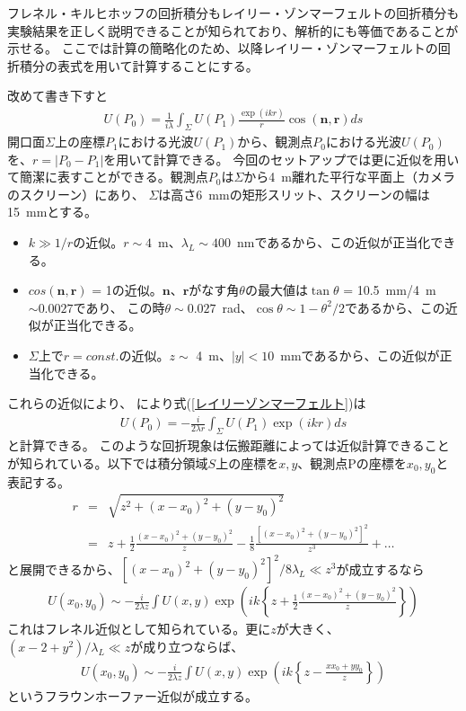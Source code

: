 \documentclass[a4paper,11pt,uplatex]{jsbook}
\begin{document}
フレネル・キルヒホッフの回折積分もレイリー・ゾンマーフェルトの回折積分も実験結果を正しく説明できることが知られており、解析的にも等価であることが示せる\cite{FToptics}。
ここでは計算の簡略化のため、以降レイリー・ゾンマーフェルトの回折積分の表式を用いて計算することにする。

改めて書き下すと
\begin{eqnarray}
  U(P_0) = \frac{1}{i\lambda}\int_{\Sigma} U(P_1)\frac{\exp(ikr)}{r}\cos(\bm{n},\bm{r})ds
\end{eqnarray}\label{レイリーゾンマーフェルト}
開口面$\Sigma$上の座標$P_1$における光波$U(P_1)$から、観測点$P_0$における光波$U(P_0)$を、$r = |P_0- P_1|$を用いて計算できる。
今回のセットアップでは更に近似を用いて簡潔に表すことができる。観測点$P_0$は$\Sigma$から4~m離れた平行な平面上（カメラのスクリーン）にあり、
$\Sigma$は高さ6~mmの矩形スリット、スクリーンの幅は15~mmとする。
\begin{itemize}
  \item $k \gg 1/r$の近似。$r\sim4$~m、$\lambda_L \sim 400$~nmであるから、この近似が正当化できる。
  \item $cos(\bm{n},\bm{r})$ = 1の近似。$\bm{n}$、$\bm{r}$がなす角$\theta$の最大値は$\tan\theta$ = 10.5~mm/4~m $\sim 0.0027$であり、
  この時$\theta\sim 0.027$~rad、$\cos\theta \sim 1 - \theta^2/2$であるから、この近似が正当化できる。
  \item $\Sigma$上で$r = const.$の近似。$z\sim$ 4~m、$|y|<10$~mmであるから、この近似が正当化できる。
\end{itemize}
これらの近似により、
により式(\ref{レイリーゾンマーフェルト})は
\begin{eqnarray}
  U(P_0) = -\frac{i}{2\lambda r} \int_{\Sigma} U(P_1)\exp(ikr) ds
  \label{レイリーゾンマーフェルト近似}
\end{eqnarray}
と計算できる。
このような回折現象は伝搬距離によっては近似計算できることが知られている。以下では積分領域$S$上の座標を$x,y$、観測点Pの座標を$x_0,y_0$と表記する。
\begin{eqnarray}
  r &=& \sqrt{z^2 + (x-x_0)^2 + (y-y_0)^2}\\
  &=& z + \frac{1}{2}\frac{(x-x_0)^2 + (y-y_0)^2}{z} - \frac{1}{8}\frac{\left[(x-x_0)^2 + (y-y_0)^2\right]^2}{z^3} +\dots
\end{eqnarray}
と展開できるから、$\left[(x-x_0)^2 + (y-y_0)^2\right]^2/8\lambda_L \ll z^3$が成立するなら
\begin{eqnarray}
  U(x_0,y_0) \sim -\frac{i}{2\lambda z}\int U(x,y) \exp(ik\left\{z +\frac{1}{2}\frac{(x-x_0)^2 + (y-y_0)^2}{z}\right\})
\end{eqnarray}
これはフレネル近似として知られている。更に$z$が大きく、$(x-2 + y^2)/\lambda_L \ll z$が成り立つならば、
\begin{eqnarray}
  U(x_0,y_0) \sim -\frac{i}{2\lambda z}\int U(x,y) \exp(ik\left\{z -\frac{xx_0 + yy_0}{z}\right\})
\end{eqnarray}
というフラウンホーファー近似が成立する。
\end{document}
